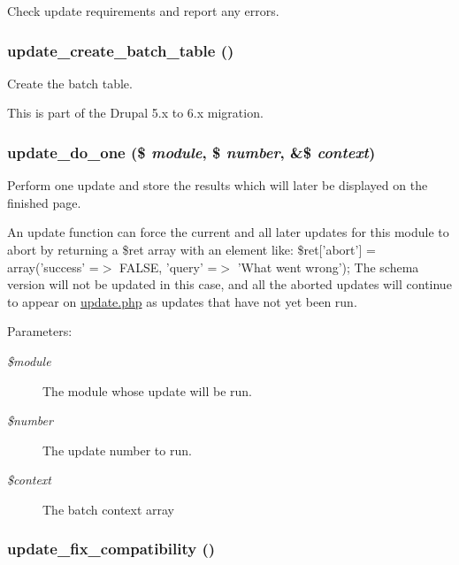 Check update requirements and report any errors. \hypertarget{update_8php_123fb38f4b7623d8ee5948c0d2e748eb}{
\subsubsection[{update\_\-create\_\-batch\_\-table}]{\setlength{\rightskip}{0pt plus 5cm}update\_\-create\_\-batch\_\-table ()}}
\label{update_8php_123fb38f4b7623d8ee5948c0d2e748eb}


Create the batch table.

This is part of the Drupal 5.x to 6.x migration. \hypertarget{update_8php_2ee6f43ad07357556589cfcee024e203}{
\subsubsection[{update\_\-do\_\-one}]{\setlength{\rightskip}{0pt plus 5cm}update\_\-do\_\-one (\$ {\em module}, \/  \$ {\em number}, \/  \&\$ {\em context})}}
\label{update_8php_2ee6f43ad07357556589cfcee024e203}


Perform one update and store the results which will later be displayed on the finished page.

An update function can force the current and all later updates for this module to abort by returning a \$ret array with an element like: \$ret\mbox{[}'abort'\mbox{]} = array('success' =$>$ FALSE, 'query' =$>$ 'What went wrong'); The schema version will not be updated in this case, and all the aborted updates will continue to appear on \hyperlink{update_8php}{update.php} as updates that have not yet been run.

\begin{Desc}
\item[Parameters:]
\begin{description}
\item[{\em \$module}]The module whose update will be run. \item[{\em \$number}]The update number to run. \item[{\em \$context}]The batch context array \end{description}
\end{Desc}
\hypertarget{update_8php_b86cb0f00b89fc52f7f6294be9a1e33c}{
\subsubsection[{update\_\-fix\_\-compatibility}]{\setlength{\rightskip}{0pt plus 5cm}update\_\-fix\_\-compatibility ()}}
\label{update_8php_b86cb0f00b89fc52f7f6294be9a1e33c}


